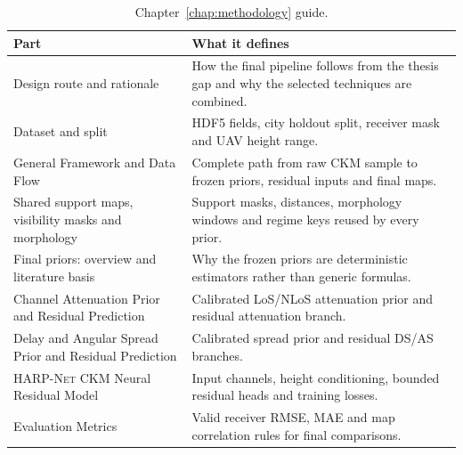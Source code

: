 \begin{table}[H]
\centering
\vspace{-0.6em}
\caption{Chapter~\ref{chap:methodology} guide.}
\label{tab:methodology_chapter_guide}
\begingroup
\footnotesize
\setlength{\tabcolsep}{3pt}
\renewcommand{\arraystretch}{0.92}
\begin{tabularx}{0.98\textwidth}{>{\raggedright\arraybackslash}p{}X}
\toprule
Part & What it defines \\
\midrule
Design route and rationale & How the final pipeline follows from the thesis gap and why the selected techniques are combined. \\
Dataset and split & HDF5 fields, city holdout split, receiver mask and UAV height range. \\
General Framework and Data Flow & Complete path from raw CKM sample to frozen priors, residual inputs and final maps. \\
Shared support maps, visibility masks and morphology & Support masks, distances, morphology windows and regime keys reused by every prior. \\
Final priors: overview and literature basis & Why the frozen priors are deterministic estimators rather than generic formulas. \\
Channel Attenuation Prior and Residual Prediction & Calibrated LoS/NLoS attenuation prior and residual attenuation branch. \\
Delay and Angular Spread Prior and Residual Prediction & Calibrated spread prior and residual DS/AS branches. \\
\textsc{HARP-Net CKM} Neural Residual Model & Input channels, height conditioning, bounded residual heads and training losses. \\
Evaluation Metrics & Valid receiver RMSE, MAE and map correlation rules for final comparisons. \\
\bottomrule
\end{tabularx}
\endgroup
\vspace{-0.8em}
\end{table}

